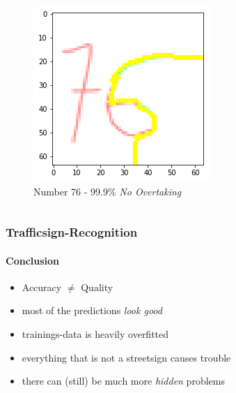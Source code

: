 \begin{frame}
\begin{columns}
\begin{column}{0.33\textwidth}
\begin{center}
\begin{figure}
				\includegraphics[width=0.9\linewidth]{Images/76Prediction}
				\caption[76]{Number 76 - 99.9\% \textit{No Overtaking}}
				\label{fig:76Pred}
			\end{figure}
		\end{center}
	\end{column}
\end{columns}
\end{frame}

\begin{frame}
	\frametitle{Trafficsign-Recognition}
	\framesubtitle{Conclusion}
	\begin{LARGE}
		\begin{itemize}
			\item Accuracy $\neq$ Quality
			\item most of the predictions \textit{look good}
			\item trainings-data is heavily overfitted
			\item everything that is not a streetsign causes trouble
			\item there can (still) be much more \textit{hidden} problems
		\end{itemize}
	\end{LARGE}
\end{frame}